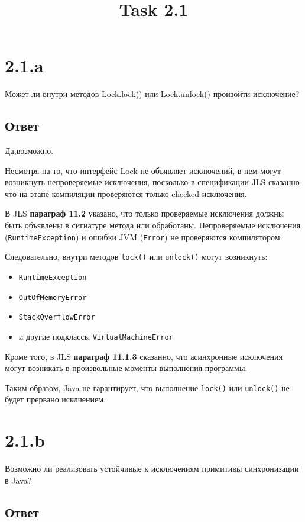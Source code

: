 \documentclass[a4paper,12pt]{article}
\title{Task 2.1}
\begin{document}
\section*{2.1.a}

Может ли внутри методов Lock.lock() или Lock.unlock() произойти исключение?

\subsection*{Ответ}

Да,возможно.

Несмотря на то, что интерфейс Lock не объявляет исключений, в нем могут возникнуть непроверяемые исключения,
посколько в спецификации JLS сказанно что на этапе компиляции проверяются только checked-исключения.

В JLS \textbf{ параграф 11.2} указано, что только проверяемые исключения должны быть объявлены в сигнатуре
метода или обработаны.
Непроверяемые исключения (\texttt{RuntimeException}) и ошибки JVM (\texttt{Error})
не проверяются компилятором.

Следовательно, внутри методов \texttt{lock()} или \texttt{unlock()} могут возникнуть:
\begin{itemize}
    \item \texttt{RuntimeException}
    \item \texttt{OutOfMemoryError}
    \item \texttt{StackOverflowError}
    \item и другие подклассы \texttt{VirtualMachineError}
\end{itemize}

Кроме того, в JLS \textbf{параграф 11.1.3} сказанно, что асинхронные исключения
могут возникать в произвольные моменты выполнения программы.

Таким образом,  Java не гарантирует, что выполнение \texttt{lock()} или \texttt{unlock()} не будет прервано
исклчением.

\section*{2.1.b}

Возможно ли реализовать устойчивые к исключениям примитивы синхронизации в Java?

\subsection*{Ответ}
\end{document}
